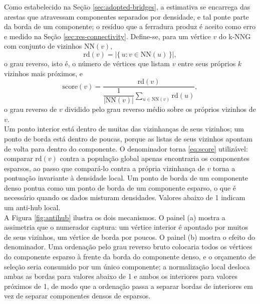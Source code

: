 Como estabelecido na Seção \ref{sec:adopted-bridges}, a estimativa se encarrega das arestas que atravessam componentes separados por densidade, e tal ponte parte da borda de um componente; o resíduo que a ferradura produz é aceito como erro e medido na Seção \ref{sec:res-connectivity}. Define-se, para um vértice $v$ do \ac{k-NNG} com conjunto de vizinhos $\mathrm{NN}(v)$,
\begin{equation}
\label{eq:rd}
\mathrm{rd}(v) = \left| \{\, u : v \in \mathrm{NN}(u) \,\} \right|,
\end{equation}
o grau reverso, isto é, o número de vértices que listam $v$ entre seus próprios $k$ vizinhos mais próximos, e
\begin{equation}
\label{eq:score}
\mathrm{score}(v) = \frac{\mathrm{rd}(v)}
     {\dfrac{1}{|\mathrm{NN}(v)|}\displaystyle\sum_{u \in \mathrm{NN}(v)} \mathrm{rd}(u)},
\end{equation}
o grau reverso de $v$ dividido pelo grau reverso médio sobre os próprios vizinhos de $v$.\\

Um ponto interior está dentro de muitas das vizinhanças de seus vizinhos; um ponto de borda está dentro de poucas, porque as listas de seus vizinhos apontam de volta para dentro do componente. O denominador torna \eqref{eq:score} utilizável: comparar $\mathrm{rd}(v)$ contra a população global apenas encontraria os componentes esparsos, ao passo que compará-lo contra a própria vizinhança de $v$ torna a pontuação invariante à densidade local. Um ponto de borda de um componente denso pontua como um ponto de borda de um componente esparso, o que é necessário quando os dados misturam densidades. Valores abaixo de 1 indicam um anti-hub local.\\

A Figura \ref{fig:antihub} ilustra os dois mecanismos. O painel (a) mostra a assimetria que o numerador captura: um vértice interior é apontado por muitos de seus vizinhos, um vértice de borda por poucos. O painel (b) mostra o efeito do denominador. Uma ordenação pelo grau reverso bruto colocaria todos os vértices do componente esparso à frente da borda do componente denso, e o orçamento de seleção seria consumido por um único componente; a normalização local desloca ambas as bordas para valores abaixo de 1 e ambos os interiores para valores próximos de 1, de modo que a ordenação passa a separar bordas de interiores em vez de separar componentes densos de esparsos.\\


